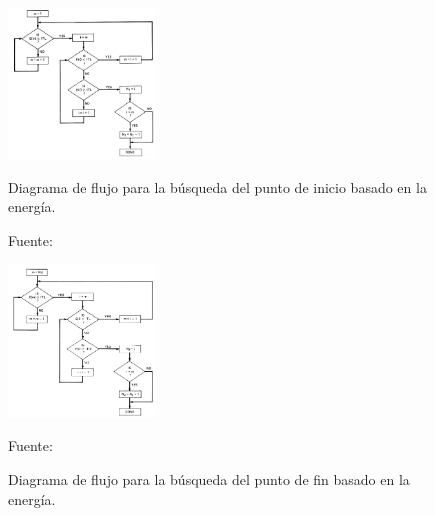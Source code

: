 \begin{enumerate}
\begin{enumerate}
\newpage
\begin{figure}[ht]
\begin{center}
\includegraphics[width=0.35\textwidth]{Imagenes/Cap2/image028}
\end{center}
\begin{center}
\vskip -0.5cm
\caption{\small{Diagrama de flujo para la búsqueda del punto de inicio basado en la energía.}}
\label{fig:figura2.27}
{\small{Fuente: \cite{rabiner}}}
\end{center}

\begin{center}
\includegraphics[width=0.35\textwidth]{Imagenes/Cap2/image029}
\end{center}
\begin{center}
\vskip -0.5cm
\caption{\small{Diagrama de flujo para la búsqueda del punto de fin basado en la energía.}}
\label{fig:figura2.28}
{\small{Fuente: \cite{rabiner}}}
\end{center}
\end{figure}


\end{enumerate}
\end{enumerate}
